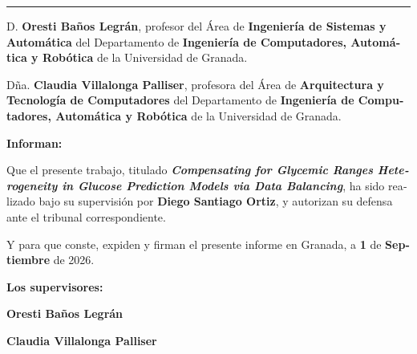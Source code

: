\cleardoublepage
\thispagestyle{empty}

\begin{otherlanguage}{spanish}

\noindent
\rule{\textwidth}{2pt}

\vspace{1cm}

D. \textbf{Oresti Baños Legrán}, profesor del Área de
\textbf{Ingeniería de Sistemas y Automática} del Departamento de
\textbf{Ingeniería de Computadores, Automática y Robótica} de la Universidad de Granada.

\vspace{0.5cm}

Dña. \textbf{Claudia Villalonga Palliser}, profesora del Área de
\textbf{Arquitectura y Tecnología de Computadores} del Departamento de
\textbf{Ingeniería de Computadores,
Automática y Robótica} de la Universidad de Granada.

\vspace{1cm}

\textbf{Informan:}

\vspace{0.5cm}

Que el presente trabajo, titulado
\textit{\textbf{Compensating for Glycemic Ranges Heterogeneity in Glucose
Prediction Models via Data Balancing}}, ha sido realizado bajo su supervisión
por \textbf{Diego Santiago Ortiz}, y autorizan su defensa ante el tribunal
correspondiente.

\vspace{0.5cm}

Y para que conste, expiden y firman el presente informe en Granada, a
\textbf{1} de \textbf{Septiembre} de 2026.

\vspace{1cm}

\textbf{Los supervisores:}

\vspace{5cm}

\noindent
\begin{minipage}[t]{0.48\textwidth}
    \centering
    \textbf{Oresti Baños Legrán}
\end{minipage}
\hfill
\begin{minipage}[t]{0.48\textwidth}
    \centering
    \textbf{Claudia Villalonga Palliser}
\end{minipage}

\end{otherlanguage}


